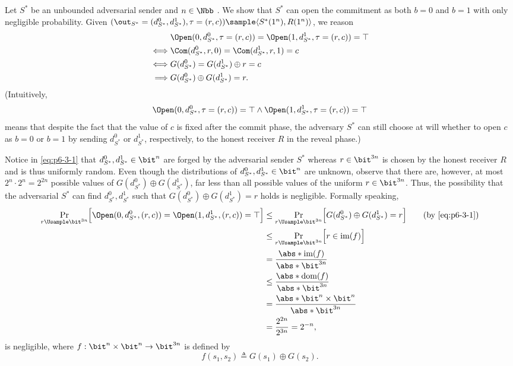 \begin{answer}[c]
    Let  $S^\ast$ be an unbounded adversarial sender and $n\in\Nbb$ . We show that $S^\ast$ can open the commitment as both $b=0$ and $b=1$ with only negligible probability. 
    Given $(\out_{S^\ast}=(d^0_{S^\ast},d^1_{S^\ast}), \tau=(r,c))\sample \langle S^\ast(1^n), R(1^n)\rangle$, we reason
    \begin{align}
        &\Open(0,d^0_{S^\ast},\tau=(r,c)) = \Open(1,d^1_{S^\ast},\tau=(r,c))=\top\notag\\
        \iff& \Com(d^0_{S^\ast},r,0)= \Com(d^1_{S^\ast},r,1)= c\notag\\
        \iff& G(d^0_{S^\ast})= G(d^1_{S^\ast})\oplus r= c \notag\\
        \implies& G(d^0_{S^\ast})\oplus G(d^1_{S^\ast}) = r. \label{eq:p6-3-1}
    \end{align}
    (Intuitively,
    \[
        \Open(0,d^0_{S^\ast},\tau=(r,c)) = \top \land \Open(1,d^1_{S^\ast},\tau=(r,c))=\top
    \]
    means that despite the fact that the value of $c$ is fixed after the commit phase, the adversary $S^\ast$ can still choose at will whether to open $c$ as $b=0$ or $b=1$ by sending $d^0_{S^\ast}$ or $d^1_{S^\ast}$, respectively, to the honest receiver $R$ in the reveal phase.)

    Notice in \eqref{eq:p6-3-1} that $d^0_{S^\ast},d^1_{S^\ast} \in \bit^n$ are forged by the adversarial sender $S^\ast$ whereas $r\in\bit^{3n}$ is chosen by the honest receiver $R$ and is thus uniformly random. Even though the distributions of $d^0_{S^\ast},d^1_{S^\ast}\in \bit^n$ are unknown, observe that there are, however, at most $2^n\cdot 2^n=2^{2n}$ possible values of $G(d^0_{S^\ast})\oplus G(d^1_{S^\ast})$, far less than all possible values of the uniform $r\in\bit^{3n}$. Thus, the possibility that the adversarial $S^\ast$ can find $d^0_{S^\ast},d^1_{S^\ast}$ such that $G(d^0_{S^\ast})\oplus G(d^1_{S^\ast}) = r$ holds is negligible. Formally speaking,
    \begin{align*}
        \Pr_{r\Usample\bit^{3n}}\Bigr[\Open(0,d^0_{S^\ast},(r,c)) = \Open(1,d^1_{S^\ast},(r,c))=\top\Bigr]
        &\le\Pr_{r\Usample\bit^{3n}}\Bigr[G(d^0_{S^\ast})\oplus G(d^1_{S^\ast}) = r \Bigr]
        \qquad \textrm{(by \eqref{eq:p6-3-1})}\\
        &\le \Pr_{r\Usample\bit^{3n}}\Bigr[ r\in \mathop{\textrm{im}} (f) \Bigr]\\
        &= \frac{\abs*{\mathop{\textrm{im}} (f) }}{\abs*{\bit^{3n}}}\\
        &\le \frac{\abs*{\mathop{\textrm{dom}} (f) }}{\abs*{\bit^{3n}}}\\
        &= \frac{\abs*{ \bit^n\times \bit^n }}{\abs*{\bit^{3n}}}\\
        &= \frac{2^{2n}}{2^{3n}} = 2^{-n},
    \end{align*}
    is negligible, where $f:\bit^n\times \bit^n\to \bit^{3n}$ is defined by
    \[
        f(s_1, s_2)\triangleq G(s_1)\oplus G(s_2).
    \]


\end{answer}
